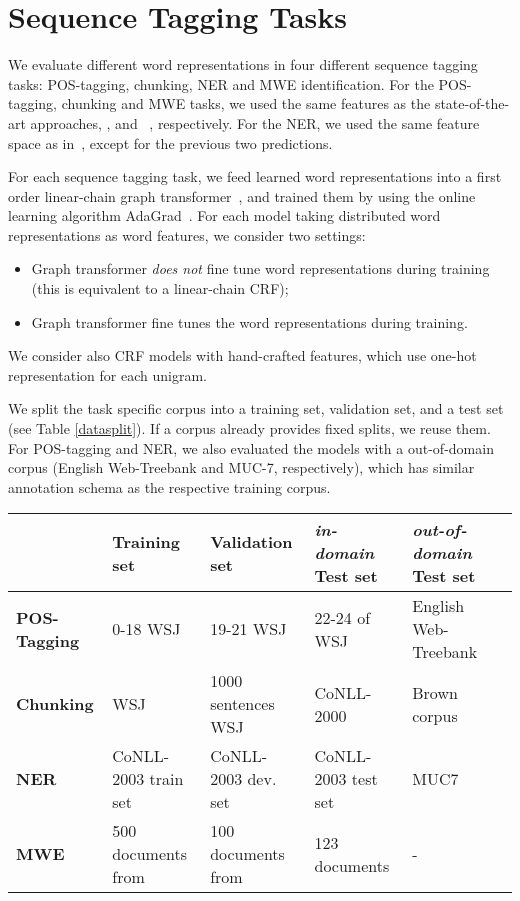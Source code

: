 \section{Sequence Tagging Tasks}
\label{sec:SeqTagging}
We evaluate different word representations in four different sequence tagging tasks: POS-tagging, chunking, NER and MWE identification. 
For the POS-tagging, chunking and MWE tasks, we used the same features as the state-of-the-art approaches,  ,  and ~, respectively. 
For the NER, we used the same feature space as in~, except for the previous two predictions.

For each sequence tagging task, we feed learned word representations into a first order linear-chain graph
transformer~\cite{collobert2011natural}, and trained them by using the online learning algorithm
AdaGrad~\cite{duchi2011adaptive}.
For each model taking distributed word representations as word features, we consider two settings: 

\begin{small}
\begin{itemize}
\item[-] Graph transformer \textit{does not} fine tune word representations during training (this is equivalent to a linear-chain CRF);
\item[-] Graph transformer fine tunes the word representations during training.
\end{itemize}
\end{small}

We consider also CRF models with hand-crafted features, which use one-hot representation for each unigram.

We split the task specific corpus into a training set, validation set, and a test set (see Table \ref{datasplit}). If a corpus already provides fixed splits, we reuse them. For POS-tagging and NER, we also evaluated the models with a out-of-domain corpus (English Web-Treebank and MUC-7, respectively), which has similar annotation schema as the respective training corpus.

\begin{table*}
\caption{Datasets splits and feature space for each sequence tagging task.}
\begin{small}
\begin{tabular}{lllp{}ll}
\hline
			& \textbf{Training set} & \textbf{Validation set} & \textbf{\textit{in-domain} Test set} & \textbf{\textit{out-of-domain} Test set} \\ \hline
\textbf{POS-Tagging} & 0-18 WSJ & 19-21 WSJ & 22-24 of WSJ & English Web-Treebank  \\
\textbf{Chunking} & WSJ & 1000 sentences WSJ & CoNLL-2000 & Brown corpus \\
\textbf{NER} & CoNLL-2003 train set & CoNLL-2003 dev. set & CoNLL-2003 test set & MUC7  \\
\textbf{MWE} & 500 documents from & 100 documents from & 123 documents & - \\
\hline
\end{tabular}
\label{datasplit}
\end{small}
\end{table*}


